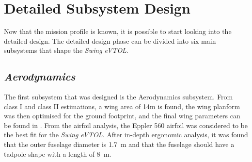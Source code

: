 \section*{Detailed Subsystem Design}
Now that the mission profile is known, it is possible to start looking into the detailed design. The detailed design phase can be divided into six main subsystems that shape the \textit{Swing eVTOL}.

\subsection*{\textit{Aerodynamics}} 
The first subsystem that was designed is the Aerodynamics subsystem.
From class I and class II estimations, a wing area of 14m is found,
the wing planform was then optimised for the ground footprint, and the final wing parameters can be found in .
From the airfoil analysis, the Eppler 560 airfoil was considered to be the best fit for the \textit{Swing eVTOL}.
After in-depth ergonomic analysis,
it was found that the outer fuselage diameter is \qty{1.7}{m}
and that the fuselage should have a tadpole shape with a length of \qty{8}{m}.


